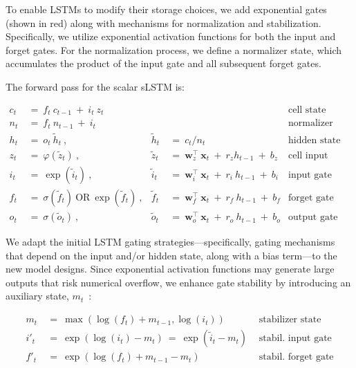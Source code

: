 To enable LSTMs to modify their storage choices, we add exponential gates (shown in red) along with mechanisms for normalization and stabilization. Specifically, we utilize exponential activation functions for both the input and forget gates. For the normalization process, we define a normalizer state, which accumulates the product of the input gate and all subsequent forget gates.

The forward pass for the scalar sLSTM is:

\begin{align}
\label{eq:slstmforward}
c_t \ &= \  f_t \ c_{t-1} \ + \ i_t \ z_t & & 
 &\text{cell state} \\
n_t \ &= \  f_t \ n_{t-1} \ + \ i_t  & & 
 &\text{normalizer state} \\
h_t \ &= \ o_t \ \tilde{h}_t \ ,
  &\tilde{h}_t \ &= \ c_t / n_t
&\text{hidden state} \\
z_t \ &= \ \varphi \left( \tilde{z}_t \right) \ , 
  &\tilde{z}_t \ &=  \ \mathbf{w}^\top_{z} \ \mathbf{x}_t \ + \
  r_{z}  h_{t-1} \ + \  b_{z}
  &\text{cell input} \\
i_t \ &= \ \!\exp \left( \tilde{i}_t  \right) \ , 
  &\tilde{i}_t \ &= \ \mathbf{w}^\top_{i} \ \mathbf{x}_t \ + \
  r_{i}  \ h_{t-1} \ + \  b_{i}
  &\text{input gate} \\
f_t \ &= \ \sigma \left(  \tilde{f}_t \right) \ \text{OR} \
\!\exp \left(  \tilde{f}_t \right) \ ,
  &\tilde{f}_t \ &= \ \mathbf{w}^\top_{f} \ \mathbf{x}_t  \ + \
  r_{f}  \ h_{t-1} \ + \  b_{f}
  &\text{forget gate} \\
o_t \ &= \ \sigma \left( \tilde{o}_t \right) \ , 
  &\tilde{o}_t  \ &= \ \mathbf{w}^\top_{o} \ \mathbf{x}_t \ + \
  r_{o}  \ h_{t-1} \ + \  b_{o}
  &\text{output gate} 
\end{align}

We adapt the initial LSTM gating strategies—specifically, gating mechanisms that depend on the input and/or hidden state, along with a bias term—to the new model designs. Since exponential activation functions may generate large outputs that risk numerical overflow, we enhance gate stability by introducing an auxiliary state, \mbox{$m_t$~\citep{Milakov:18arxiv}}:

\begin{align}
\label{eq:slstmstabil}
m_t \ &= \ \max \left( \log ( f_t ) + m_{t-1} , \log ( i_t ) \right) &\text{stabilizer state} \\
i'_t \ &= \ \!\exp \left( \log \left ( i_t \right) - m_t \right) \ = \ \!\exp \left( \tilde{i}_t - m_t \right) \ \, 
  &\text{stabil. input gate} \\
f'_t \ &= \ \!\exp \left( \log \left( f_t \right) + m_{t-1} - m_t \right) \ \, 
  &\text{stabil. forget gate}
\end{align}


